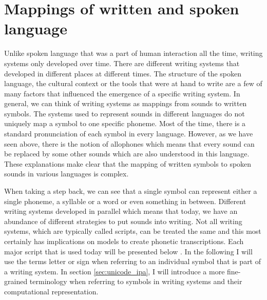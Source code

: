 \section{Mappings of written and spoken language}
\label{writing-sys}
Unlike spoken language that was a part of human interaction all the time, writing systems only developed over time. There are different writing systems that developed in different places at different times. The structure of the spoken language, the cultural context or the tools that were at hand to write are a few of many factors that influenced the emergence of a specific writing system. In general, we can think of writing systems as mappings from sounds to written symbols. The systems used to represent sounds in different languages do not uniquely map a symbol to one specific phoneme. Most of the time, there is a standard pronunciation of each symbol in every language. However, as we have seen above, there is the notion of allophones which means that every sound can be replaced by some other sounds which are also understood in this language. These explanations make clear that the mapping of written symbols to spoken sounds in various languages is complex. 

When taking a step back, we can see that a single symbol can represent either a single phoneme, a syllable or a word or even something in between. Different writing systems developed in parallel which means that today, we have an abundance of different strategies to put sounds into writing. Not all writing systems, which are typically called scripts, can be treated the same and this most certainly has implications on models to create phonetic transcriptions. Each major script that is used today will be presented below \citep{writing-systems}. In the following I will use the terms letter or sign when referring to an individual symbol that is part of a writing system. In section \ref{sec:unicode_ipa}, I will introduce a more fine-grained terminology when referring to symbols in writing systems and their computational representation. 

